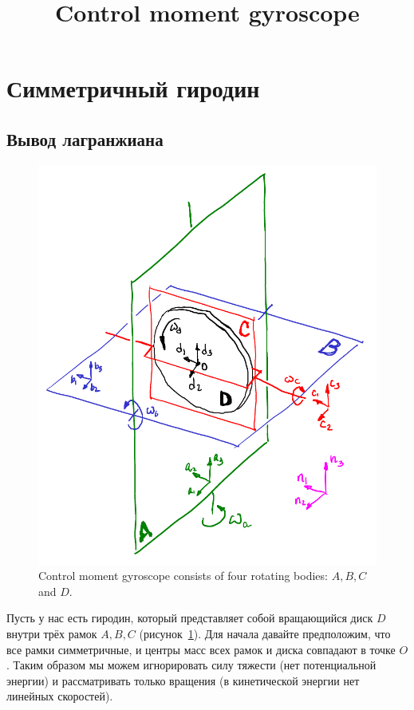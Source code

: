 \documentclass{article}
\title{Control moment gyroscope}
\author{}
\date{}
\begin{document}
\maketitle

\section{Симметричный гиродин}
\subsection{Вывод лагранжиана}

\begin{figure}[!ht]
\centering
\includegraphics[width=.5\linewidth]{cmg750}
\caption{Control moment gyroscope consists of four rotating bodies: $A, B, C$ and $D$.}
\label{fig:cmg750}
\end{figure}

Пусть у нас есть гиродин, который представляет собой вращающийся диск $D$ внутри трёх рамок $A,B,C$ (рисунок~\ref{fig:cmg750}).
Для начала давайте предположим, что все рамки симметричные, и центры масс всех рамок и диска совпадают в точке $O$.
Таким образом мы можем игнорировать силу тяжести (нет потенциальной энергии) и рассматривать только вращения (в кинетической энергии нет линейных скоростей).
\end{document}
